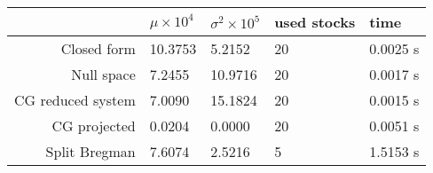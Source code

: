\begin{tabular}{ r|llll }
& $\mu \times 10^{4}$ & $\sigma^2 \times 10^{5}$ & used stocks & time  \\ 
 \hline
Closed form& 10.3753 & 5.2152 & 20 & 0.0025 s  \\ 
Null space& 7.2455 & 10.9716 & 20 & 0.0017 s  \\ 
CG reduced system& 7.0090 & 15.1824 & 20 & 0.0015 s  \\ 
CG projected& 0.0204 & 0.0000 & 20 & 0.0051 s \\ 
Split Bregman& 7.6074 & 2.5216 & 5 & 1.5153 s \\ 

 \end{tabular}